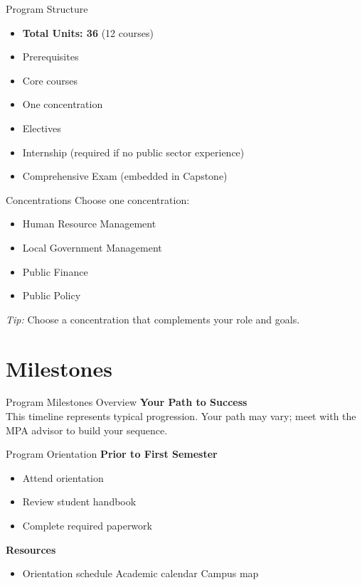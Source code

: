 \documentclass[10pt]{beamer}
\begin{document}
\begin{frame}{Program Structure}
\begin{itemize}
  \item \textbf{Total Units: 36} (12 courses)
  \item Prerequisites
  \item Core courses
  \item One concentration
  \item Electives
  \item Internship (required if no public sector experience)
  \item Comprehensive Exam (embedded in Capstone)
\end{itemize}
\end{frame}

\begin{frame}{Concentrations}
Choose one concentration:
\begin{itemize}
  \item Human Resource Management
  \item Local Government Management
  \item Public Finance
  \item Public Policy
\end{itemize}
\emph{Tip:} Choose a concentration that complements your role and goals.
\end{frame}

\section{Milestones}
\begin{frame}{Program Milestones Overview}
\centering
\textbf{Your Path to Success}\\[4pt]
\small This timeline represents typical progression. Your path may vary; meet with the MPA advisor to build your sequence.
\end{frame}

\begin{frame}{Program Orientation}
\textbf{Prior to First Semester}
\begin{itemize}
  \item Attend orientation
  \item Review student handbook
  \item Complete required paperwork
\end{itemize}
\textbf{Resources}
\begin{itemize}
  \item Orientation schedule \quad Academic calendar \quad Campus map
\end{itemize}
\end{frame}
\end{document}
